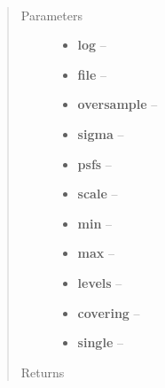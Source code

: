 \documentclass[a4paper,11pt,english]{sphinxmanual}
\begin{document}
\begin{fulllineitems}
\label{reduction:analysis.cosmicrayCalibration.testCosmicrayRejectionMultiPSF}~\begin{quote}\begin{description}
\item[{Parameters}] \leavevmode\begin{itemize}
\item {} 
\textbf{log} -- 

\item {} 
\textbf{file} -- 

\item {} 
\textbf{oversample} -- 

\item {} 
\textbf{sigma} -- 

\item {} 
\textbf{psfs} -- 

\item {} 
\textbf{scale} -- 

\item {} 
\textbf{min} -- 

\item {} 
\textbf{max} -- 

\item {} 
\textbf{levels} -- 

\item {} 
\textbf{covering} -- 

\item {} 
\textbf{single} -- 

\end{itemize}

\item[{Returns}] \leavevmode


\end{description}\end{quote}

\end{fulllineitems}

\label{reduction:module-analysis.analyseGhosts}
\end{document}
